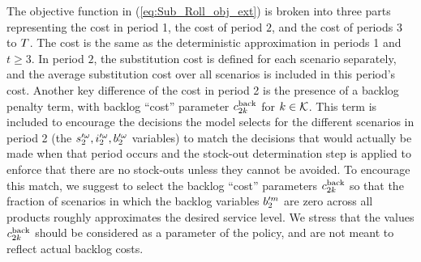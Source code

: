 \documentclass[msom]{oo}
\begin{document}
The objective function in (\ref{eq:Sub_Roll_obj_ext}) is broken into three parts representing the cost in period 1, the cost of period $2$, and the cost of periods $3$ to $T$. The cost is the same as the deterministic approximation in periods 1 and $t \geq 3$. In period $2$, the substitution cost is defined for each scenario separately, and the average substitution cost over all scenarios is included in this period's cost. Another key difference of the cost in period 2 is the presence of a backlog penalty term, with backlog ``cost'' parameter $c^{\text{back}}_{2 k}$ for $k \in \mathcal{K}$. This term is included to encourage the decisions the model selects for the different scenarios in period 2 (the $s'^{\omega}_{2},i'^{\omega}_2,b'^{\omega}_2$ variables) to match the decisions that would actually be made when that period occurs and the stock-out determination step is applied to enforce that there are no stock-outs unless they cannot be avoided. To encourage this match, we suggest to select the backlog ``cost'' parameters $c^{\text{back}}_{2 k}$ so that the fraction of scenarios in which the backlog variables $b'^m_2$ are zero across all products roughly approximates the desired service level. We stress that the values $c^{\text{back}}_{2 k}$ should be considered as a parameter of the policy, and are not meant to reflect actual backlog costs.
\end{document}
